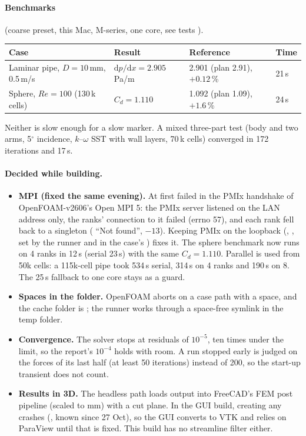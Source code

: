 \paragraph{Benchmarks} (coarse preset, this Mac, M-series, one core, see tests ).
\begin{center}\small
\begin{tabular}{@{}llll@{}}
\toprule Case & Result & Reference & Time\\ \midrule
Laminar pipe, $D=10$\,mm, 0.5\,m/s & $\mathrm dp/\mathrm dx=2.905$\,Pa/m & 2.901 (plan 2.91), $+0.12$\,\% & 21\,s\\
Sphere, $Re=100$ (130\,k cells) & $C_d=1.110$ & 1.092 (plan 1.09), $+1.6$\,\% & 24\,s\\
\bottomrule
\end{tabular}
\end{center}
Neither is slow enough for a slow marker. A mixed three-part test (body and two arms, 5$^\circ$ incidence, $k$--$\omega$
SST with wall layers, 70\,k cells) converged in 172 iterations and 17\,s.

\paragraph{Decided while building.}
\begin{itemize}[nosep]
  \item \textbf{MPI (fixed the same evening).} At first  failed in the PMIx handshake of OpenFOAM-v2606's
        Open MPI 5: the PMIx server listened on the LAN address only, the ranks' connection to it failed (errno 57),
        and each rank fell back to a singleton ( ``Not found'', $-13$). Keeping PMIx on the loopback
        (, , set by the runner and in
        the case's ) fixes it. The sphere benchmark now runs on 4 ranks in 12\,s (serial 23\,s) with the
        same $C_d=1.110$. Parallel is used from 50k cells: a 115k-cell pipe took 534\,s serial, 314\,s on 4 ranks and
        190\,s on 8. The 25\,s fallback to one core stays as a guard.
  \item \textbf{Spaces in the folder.} OpenFOAM aborts on a case path with a space, and the cache folder is
        ; the runner works through a space-free symlink in the temp folder.
  \item \textbf{Convergence.} The solver stops at residuals of $10^{-5}$, ten times under the limit, so the report's
        $10^{-4}$ holds with room. A run stopped early is judged on the forces of its last half (at least 50
        iterations) instead of 200, so the start-up transient does not count.
  \item \textbf{Results in 3D.} The headless path loads  output into FreeCAD's FEM post pipeline
        (scaled to mm) with a cut plane. In the GUI build, creating any  crashes
        (, known since 27 Oct), so the GUI converts to VTK and relies on ParaView
        until that is fixed. This build has no streamline filter either.
\end{itemize}
